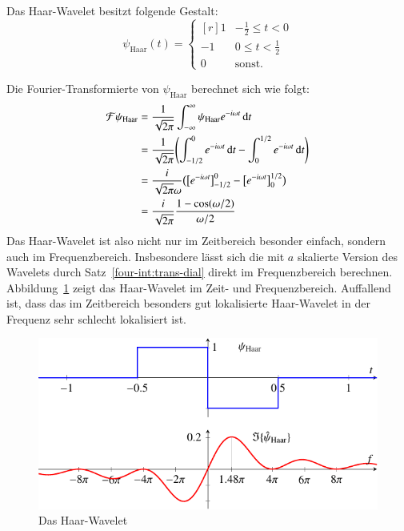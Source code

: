 \begin{definition}
	\label{complex:def-haar-wavelet}
	Das Haar-Wavelet besitzt folgende Gestalt:
	\[
	\psi_{\text{Haar}}(t) = \left\lbrace\begin{matrix*}[r]
	1 & -\frac{1}{2} \le t < 0  \\
	-1 & 0 \le t < \frac{1}{2} \\
	0 & \text{sonst}.
	\end{matrix*} \right.\label{complex:def-haar}
	\]
\end{definition}
Die Fourier-Transformierte von $\psi_{\text{Haar}}$ berechnet sich wie folgt:
\begin{align}
	\Four \psi_\text{Haar}  
	&= \frac{1}{\sqrt{2\pi}}\int_{-\infty}^{\infty} \psi_\text{Haar} e^{-i\omega t} \,\mathrm{d}t\nonumber\\
	&= \frac{1}{\sqrt{2\pi}}\Biggl( \int_{-1/2}^{0} e^{-i\omega t} \,\mathrm{d}t - \int_{0}^{1/2} e^{-i\omega t}\,\mathrm{d}t \Biggr) \nonumber\\
	&= \frac{i}{\sqrt{2\pi}\omega}\bigl( \bigl[ e^{-i\omega t}\bigr]_{-1/2}^0  - \bigl[ e^{-i\omega t}\bigr]_{0}^{1/2} \bigr)\nonumber\\
	&= \frac{i}{\sqrt{2\pi}} \frac{1-\cos(\omega/2)}{\omega/2}\label{complex:f-psi-haar}
\end{align}
Das Haar-Wavelet ist also nicht nur im Zeitbereich besonder einfach, sondern auch im Frequenzbereich.
Insbesondere lässt sich die mit $a$ skalierte Version des Wavelets durch Satz~\ref{four-int:trans-dial} direkt im Frequenzbereich berechnen.
Abbildung~\ref{complex:haar} zeigt das Haar-Wavelet im Zeit- und Frequenzbereich.
Auffallend ist, dass das im Zeitbereich besonders gut lokalisierte Haar-Wavelet in der Frequenz sehr schlecht lokalisiert ist.
\begin{figure}
	\centering
	\includegraphics{papers/complex/images/haar.pdf}
	\caption{Das Haar-Wavelet}
	\label{complex:haar}
\end{figure}


